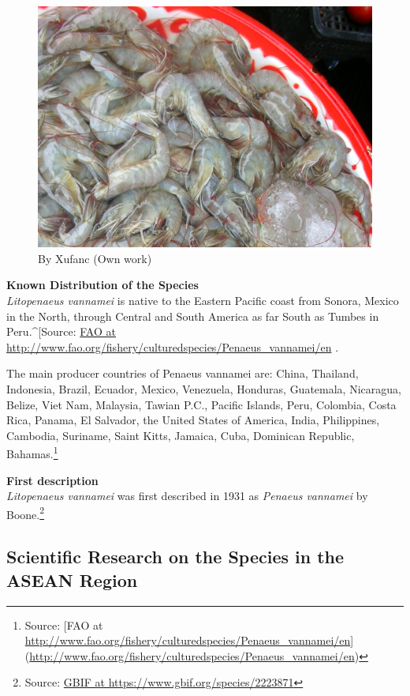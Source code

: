 \documentclass[]{book}
\theoremstyle{definition}
\theoremstyle{definition}
\theoremstyle{definition}
\theoremstyle{remark}
\begin{document}
\begin{figure}
\centering
\includegraphics{images_species/Litopenaeus_vannamei55.jpg}
\caption{By Xufanc (Own work)}
\end{figure}

\textbf{Known Distribution of the Species}\\
\emph{Litopenaeus vannamei} is native to the Eastern Pacific coast from
Sonora, Mexico in the North, through Central and South America as far
South as Tumbes in Peru.\^{}{[}Source:
\href{http://www.fao.org/fishery/culturedspecies/Penaeus_vannamei/en}{FAO
at http://www.fao.org/fishery/culturedspecies/Penaeus\_vannamei/en} .

The main producer countries of Penaeus vannamei are: China, Thailand,
Indonesia, Brazil, Ecuador, Mexico, Venezuela, Honduras, Guatemala,
Nicaragua, Belize, Viet Nam, Malaysia, Tawian P.C., Pacific Islands,
Peru, Colombia, Costa Rica, Panama, El Salvador, the United States of
America, India, Philippines, Cambodia, Suriname, Saint Kitts, Jamaica,
Cuba, Dominican Republic, Bahamas.\footnote{Source: {[}FAO at
  \url{http://www.fao.org/fishery/culturedspecies/Penaeus_vannamei/en}{]}
  (\url{http://www.fao.org/fishery/culturedspecies/Penaeus_vannamei/en})}

\textbf{First description}\\
\emph{Litopenaeus vannamei} was first described in 1931 as \emph{Penaeus
vannamei} by Boone.\footnote{Source:
  \href{https://www.gbif.org/species/2223871}{GBIF at
  https://www.gbif.org/species/2223871}}

\hypertarget{scientific-research-on-the-species-in-the-asean-region}{%
\subsection{Scientific Research on the Species in the ASEAN
Region}\label{scientific-research-on-the-species-in-the-asean-region}}
\end{document}
